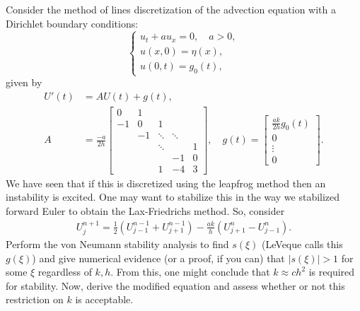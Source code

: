 \documentclass[12pt]{report}
\begin{document}
\newpage



\begin{problem}
    Consider the method of lines discretization of the advection equation with a Dirichlet boundary conditions:
  $$ \begin{cases} u_t + a u_{x} = 0, \quad a > 0,\\
u(x,0) = \eta(x),\\
u(0,t) = g_0(t), \end{cases} $$
given by
\begin{align*}
  U'(t) &= A U(t) + g(t),\\
  A &= \frac{-a}{2h} \begin{bmatrix} 0 & 1 \\
    -1 & 0 & 1 \\
    & -1 & \ddots & \ddots \\
    && \ddots && 1\\
    &&& -1 & 0 \\
    &&1 & -4 & 3
  \end{bmatrix}, \quad g(t) = \begin{bmatrix} \frac{ak}{2h} g_0(t) \\ 0 \\ \vdots \\ 0 \end{bmatrix}.
\end{align*}
We have seen that if this is discretized using the leapfrog method then an instability is excited.  One may want to stabilize this in the way we stabilized forward Euler to obtain the Lax-Friedrichs method.  So, consider
\begin{align*}
  U_j^{n+1} = \frac 1 2 ( U_{j-1}^{n-1} + U_{j+1}^{n-1}) - \frac{ak}{h} ( U_{j+1}^n - U_{j-1}^n).
\end{align*}
Perform the von Neumann stability analysis to find $s(\xi)$ (LeVeque calls this $g(\xi)$) and give numerical evidence (or a proof, if you can) that $|s(\xi)| > 1$ for some $\xi$ regardless of $k,h$.  From this, one might conclude that $k \approx c h^2$ is required for stability.  Now, derive the modified equation and assess whether or not this restriction on $k$ is acceptable.
\end{problem}
\end{document}
